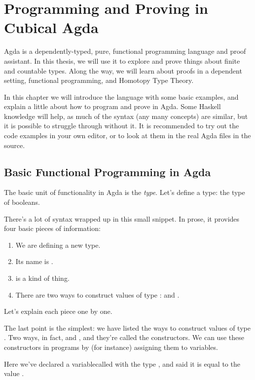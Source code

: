 \chapter{Programming and Proving in Cubical Agda}
Agda \cite{norellDependentlyTypedProgramming2008} is a dependently-typed, pure,
functional programming language and proof assistant.
In this thesis, we will use it to explore and prove things about finite and
countable types.
Along the way, we will learn about proofs in a dependent setting, functional
programming, and Homotopy Type Theory.

In this chapter we will introduce the language with some basic examples, and
explain a little about how to program and prove in Agda.
Some Haskell knowledge will help, as much of the syntax (any many concepts) are
similar, but it is possible to struggle through without it.
It is recommended to try out the code examples in your own editor, or to look at
them in the real Agda files in the source.
\section{Basic Functional Programming in Agda}
The basic unit of functionality in Agda is the \emph{type}.
Let's define a type: the type of booleans.
\begin{agdalisting*}
\end{agdalisting*}
There's a lot of syntax wrapped up in this small snippet.
In prose, it provides four basic pieces of information:
\begin{enumerate}
  \item We are defining a new  type.
  \item Its name is .
  \item {} is a  kind of thing.
  \item There are two ways to construct values of type :
     and .
\end{enumerate}
Let's explain each piece one by one.

The last point is the simplest: we have listed the ways to construct values of
type .
Two ways, in fact,  and
, and they're called the constructors.
We can use these constructors in programs by (for instance) assigning them to
variables.
\begin{agdalisting*}
\end{agdalisting*}
Here we've declared a variable\footnotemark called  with
the type , and said it is equal to the value
.

